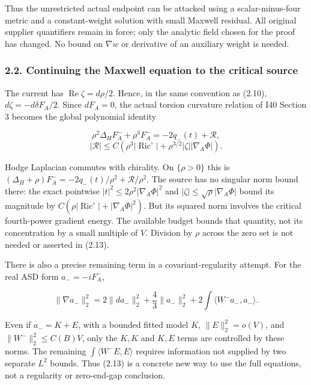 \documentclass[
  10pt,
]{article}
\begin{document}
Thus the unrestricted actual endpoint can be attacked using a
scalar-minus-four metric and a constant-weight solution with small
Maxwell residual. All original supplier quantifiers remain in force;
only the analytic field chosen for the proof has changed. No bound on
\(\nabla w\) or derivative of an auxiliary weight is needed.

\hypertarget{continuing-the-maxwell-equation-to-the-critical-source}{%
\subsubsection{2.2. Continuing the Maxwell equation to the critical
source}\label{continuing-the-maxwell-equation-to-the-critical-source}}

The current has \(\operatorname{Re}\zeta=d\rho/2\). Hence, in the same
convention as (2.10), \(d\zeta=-d\delta F_A/2\). Since \(dF_A=0\), the
actual torsion curvature relation of I40 Section 3 becomes the global
polynomial identity

\[
 \boxed{\rho^2\Delta_H F_A^-+\rho^3F_A^-
                  =-2q_-(t)+\mathcal R,}
 \tag{2.13}
\] \[
 |\mathcal R|\le C\left(\rho^3|\operatorname{Ric}^{\circ}|
                 +\rho^{3/2}|\zeta||\nabla_A\Phi|\right).
\]

Hodge Laplacian commutes with chirality. On \(\{\rho>0\}\) this is
\((\Delta_H+\rho)F_A^-=-2q_-(t)/\rho^2+\mathcal R/\rho^2\). The source
has no singular norm bound there: the exact pointwise
\(|t|^2\le2\rho^2|\nabla_A\Phi|^2\) and
\(|\zeta|\le\sqrt\rho|\nabla_A\Phi|\) bound its magnitude by
\(C(\rho|\operatorname{Ric}^{\circ}|+|\nabla_A\Phi|^2)\). But its
squared norm involves the critical fourth-power gradient energy. The
available budget bounds that quantity, not its concentration by a small
multiple of \(V\). Division by \(\rho\) across the zero set is not
needed or asserted in (2.13).

There is also a precise remaining term in a covariant-regularity
attempt. For the real ASD form \(a_-=-iF_A^-\),

\[
 \|\nabla a_-\|_2^2=2\|da_-\|_2^2+
       \frac43\|a_-\|_2^2+2\int\langle W^-a_-,a_-\rangle.
 \tag{2.14}
\]

Even if \(a_-=K+E\), with a bounded fitted model \(K\),
\(\|E\|_2^2=o(V)\), and \(\|W^-\|_2^2\le C(B)V\), only the \(K,K\) and
\(K,E\) terms are controlled by these norms. The remaining
\(\int\langle W^-E,E\rangle\) requires information not supplied by two
separate \(L^2\) bounds. Thus (2.13) is a concrete new way to use the
full equations, not a regularity or zero-end-gap conclusion.
\end{document}
